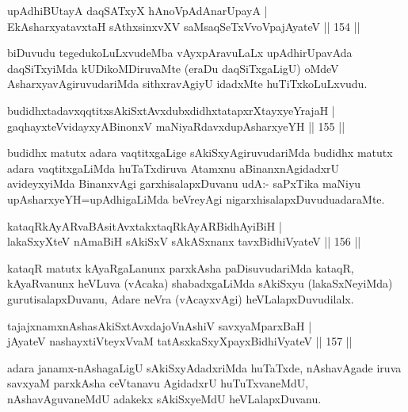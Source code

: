 
\begin{shl}
upAdhiBUtayA daqSATxyX hAnoVpAdAnarUpayA |\\
EkAsharxyatavxtaH sAthxsinxvXV saMsaqSeTxVvoVpajAyateV \hfill || 154 ||
\end{shl}

\begin{artha}
biDuvudu tegedukoLuLxvudeMba vAyxpAravuLaLx upAdhirUpavAda daqSiTxyiMda kUDikoMDiruvaMte (eraDu daqSiTxgaLigU) oMdeV AsharxyavAgiruvudariMda sithxravAgiyU idadxMte huTiTxkoLuLxvudu.
\end{artha}


\begin{shl}
budidhxtadavxqqtitxsAkiSxtAvxdubxdidhxtatapxrXtayxyeYrajaH |\\
gaqhayxteV\s vidayxyA\s BinonxV maNiyaRdavxdupAsharxyeYH \hfill || 155 ||
\end{shl}

\begin{artha}
budidhx matutx adara vaqtitxgaLige sAkiSxyAgiruvudariMda budidhx matutx adara vaqtitxgaLiMda huTaTxdiruva Atamxnu aBinanxnAgidadxrU avideyxyiMda BinanxvAgi garxhisalapxDuvanu udA:- saPxTika maNiyu upAsharxyeYH=upAdhigaLiMda beVreyAgi nigarxhisalapxDuvudu\break adaraMte.
\end{artha}%

\begin{shl}
kataqRkAyARvaBAsitAvxtakxtaqRkAyARBidhAyiBiH |\\
lakaSxyXteV nAmaBiH sAkiSxV sAkASxnanx tavxBidhiVyateV \hfill || 156 ||
\end{shl}

\begin{artha}
kataqR matutx kAyaRgaLanunx parxkAsha paDisuvudariMda kataqR, kAyaRvanunx heVLuva (vAcaka) shabadxgaLiMda sAkiSxyu (lakaSxNeyiMda) gurutisalapxDuvanu, Adare neVra (vAcayxvAgi) heVLalapxDuvudilalx.
\end{artha}

\begin{shl}
tajajxnamxnAshasAkiSxtAvxdajoV\s nAshiV savxyaMparxBaH |\\
jAyateV nashayxtiVteyxVvaM tatAsxkaSxyXpayxBidhiVyateV \hfill || 157 ||
\end{shl}

\begin{artha}
adara janamx-nAshagaLigU sAkiSxyAdadxriMda huTaTxde, nAshavAgade iruva savxyaM parxkAsha ceVtanavu AgidadxrU huTuTxvaneMdU, nAshavAguvaneMdU adakekx sAkiSxyeMdU heVLalapxDuvanu.
\end{artha}


